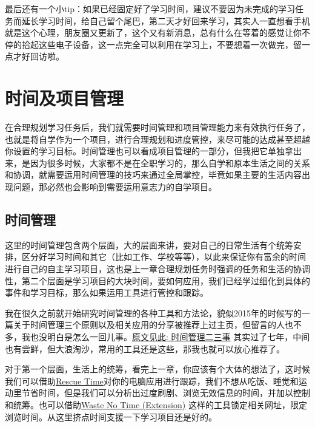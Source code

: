 \documentclass[
]{book}
\begin{document}
最后还有一个小tip：如果已经固定好了学习时间，建议不要因为未完成的学习任务而延长学习时间，给自己留个尾巴，第二天才好回来学习，其实人一直想看手机就是这个心理，朋友圈又更新了，这个又有新消息，总有什么在等着的感觉让你不停的拾起这些电子设备，这一点完全可以利用在学习上，不要想着一次做完，留一点才好回访啦。

\hypertarget{ux65f6ux95f4ux53caux9879ux76eeux7ba1ux7406}{%
\chapter{时间及项目管理}\label{ux65f6ux95f4ux53caux9879ux76eeux7ba1ux7406}}

在合理规划学习任务后，我们就需要时间管理和项目管理能力来有效执行任务了，也就是将自学作为一个项目，进行合理规划和进度管控，来尽可能的达成甚至超越你设置的学习目标。时间管理也可以看成项目管理的一部分，但我把它单独拿出来，是因为很多时候，大家都不是在全职学习的，那么自学和原本生活之间的关系和协调，就需要运用时间管理的技巧来通过全局掌控，毕竟如果主要的生活内容出现问题，那必然也会影响到需要运用意志力的自学项目。

\hypertarget{ux65f6ux95f4ux7ba1ux7406}{%
\section{时间管理}\label{ux65f6ux95f4ux7ba1ux7406}}

这里的时间管理包含两个层面，大的层面来讲，要对自己的日常生活有个统筹安排，区分好学习时间和其它（比如工作、学校等等），以此来保证你有富余的时间进行自己的自主学习项目，这也是上一章合理规划任务时强调的任务和生活的协调性，第二个层面是学习项目的大块时间，要如何应用，我们已经学过细化到具体的事件和学习目标，那么如果运用工具进行管控和跟踪。

我在很久之前就开始研究时间管理的各种工具和方法论，貌似2015年的时候写的一篇关于时间管理三个原则以及相关应用的分享被推荐上过主页，但留言的人也不多，我也没明白是怎么一回儿事。\href{https://www.douban.com/note/503440000/?_i=7795608Lsx5Xfa}{原文见此: 时间管理二三事} 其实过了七年，中间也有尝鲜，但大浪淘沙，常用的工具还是这些，那我也就可以放心推荐了。

对于第一个层面，生活上的统筹，看完上一章，你应该有个大体的想法了，这时候我们可以借助\href{https://www.rescuetime.com}{Rescue Time}对你的电脑应用进行跟踪，我们不想从吃饭、睡觉和运动里节省时间，但是我们可以分析出过度刷剧、浏览无效信息的时间，并加以控制和统筹。也可以借助\href{http://www.bumblebeesystems.com/wastenotime/}{Waste No Time (Extension)} 这样的工具锁定相关网址，限定浏览时间。从这里挤点时间支援一下学习项目还是好的。
\end{document}
